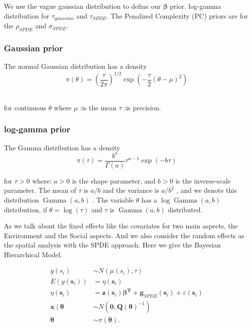 \documentclass{mcmthesis}
\begin{document}
We use the vague gaussian distribution to define our $\boldsymbol{\beta}$ prior. log-gamma distribution for $\tau_{gaussian}$ and $\tau_{SPDE}$. The Penalized Complexity (PC) priors are for the $\rho_{SPDE}$ and $\sigma_{SPDE}$.



\subsubsection{Gaussian prior}
The normal Gaussian distribution has a density
\begin{equation}
    \pi(\theta) = \left(\frac{\tau}{2 \pi}\right)^{1 / 2} \exp \left(-\frac{\tau}{2}(\theta-\mu)^{2}\right)
\end{equation}

\\
  for continuous $\theta$ where $\mu$ :is the mean $\tau$ :is precision.

\subsubsection{log-gamma prior}
The Gamma distribution has a density
\begin{equation}
    \pi(\tau)=\frac{b^{a}}{\Gamma(a)} \tau^{a-1} \exp (-b \tau)
\end{equation}

for  $\tau>0$  where:
 $a>0$  is the shape parameter, and
 $b>0$  is the inverse-scale parameter.
The mean of  $\tau$  is  $a / b$  and the variance is  $a / b^{2}$ , and we denote this distribution  $\operatorname{Gamma}(a, b)$ . The variable  $\theta$  has a  $\log \operatorname{Gamma}(a, b)$  distribution, if  $\theta=\log (\tau)$  and  $\tau$  is  $\operatorname{Gamma}(a, b)$  distributed.

As we talk about the fixed effects like the covariates for two main aspects, the Environment and the Social aspects. And we also consider the random effects as the spatial analysis with the SPDE approach. Here we give the Bayesian Hierarchical Model. 

\begin{center}
\begin{align}
     y (s_{i})&\sim N (\mu(s_{i}),\tau)\\
     E(y\left(\boldsymbol{s}_{i}\right))&=\eta\left(\boldsymbol{s}_{i}\right)\\
\eta\left(\boldsymbol{s}_{i}\right)&=\boldsymbol{z}\left(\boldsymbol{s}_{i}\right)\boldsymbol{\beta^T}
+\boldsymbol{g}_{SPDE}\left(\boldsymbol{s}_{i}\right)+\varepsilon\left(\boldsymbol{s}_{i}\right)
\\
 \boldsymbol{x} \mid \boldsymbol{\theta} &\sim N\left(\boldsymbol{0}, \boldsymbol{Q}(\boldsymbol{\theta})^{-1}\right)
 \\
 \boldsymbol{\theta} &\sim \pi(\boldsymbol{\theta}).
\end{align}
\end{center}
\end{document}
